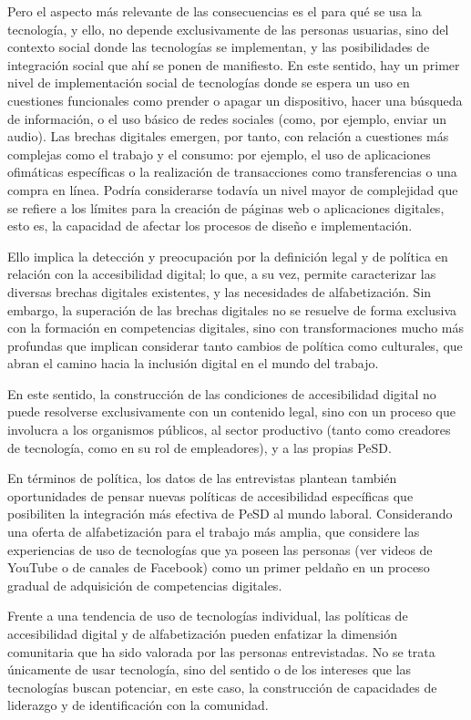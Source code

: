 Pero el aspecto más relevante de las consecuencias es el para qué se usa
la tecnología, y ello, no depende exclusivamente de las personas
usuarias, sino del contexto social donde las tecnologías se implementan,
y las posibilidades de integración social que ahí se ponen de
manifiesto. En este sentido, hay un primer nivel de implementación
social de tecnologías donde se espera un uso en cuestiones funcionales
como prender o apagar un dispositivo, hacer una búsqueda de información,
o el uso básico de redes sociales (como, por ejemplo, enviar un audio).
Las brechas digitales emergen, por tanto, con relación a cuestiones más
complejas como el trabajo y el consumo: por ejemplo, el uso de
aplicaciones ofimáticas específicas o la realización de transacciones
como transferencias o una compra en línea. Podría considerarse todavía
un nivel mayor de complejidad que se refiere a los límites para la
creación de páginas web o aplicaciones digitales, esto es, la capacidad
de afectar los procesos de diseño e implementación.

Ello implica la detección y preocupación por la definición legal y de
política en relación con la accesibilidad digital; lo que, a su vez,
permite caracterizar las diversas brechas digitales existentes, y las
necesidades de alfabetización. Sin embargo, la superación de las brechas
digitales no se resuelve de forma exclusiva con la formación en
competencias digitales, sino con transformaciones mucho más profundas
que implican considerar tanto cambios de política como culturales, que
abran el camino hacia la inclusión digital en el mundo del trabajo.

En este sentido, la construcción de las condiciones de accesibilidad
digital no puede resolverse exclusivamente con un contenido legal, sino
con un proceso que involucra a los organismos públicos, al sector
productivo (tanto como creadores de tecnología, como en su rol de
empleadores), y a las propias PeSD.

En términos de política, los datos de las entrevistas plantean también
oportunidades de pensar nuevas políticas de accesibilidad específicas
que posibiliten la integración más efectiva de PeSD al mundo laboral.
Considerando una oferta de alfabetización para el trabajo más amplia,
que considere las experiencias de uso de tecnologías que ya poseen las
personas (ver videos de YouTube o de canales de Facebook) como un primer
peldaño en un proceso gradual de adquisición de competencias digitales.

Frente a una tendencia de uso de tecnologías individual, las políticas
de accesibilidad digital y de alfabetización pueden enfatizar la
dimensión comunitaria que ha sido valorada por las personas
entrevistadas. No se trata únicamente de usar tecnología, sino del
sentido o de los intereses que las tecnologías buscan potenciar, en este
caso, la construcción de capacidades de liderazgo y de identificación
con la comunidad.
